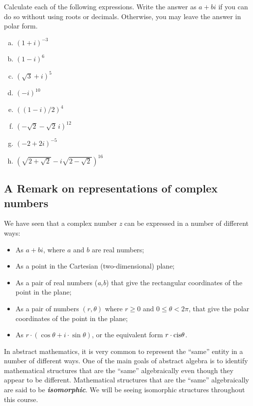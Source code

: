  

\begin{exercise}\label{exercise:complex:31}
Calculate each of the following expressions. Write the answer as $a + bi$ if you can do so without using roots or decimals. Otherwise, you may leave the answer in polar form.
\begin{multicols}{2}
\begin{enumerate}[(a)]
 
 \item
$(1+i)^{-3}$
 \item
$(1 - i)^{6}$
 \item
$(\sqrt{3}+i)^{5}$
 \item
$(-i)^{10}$
 \item
$((1-i)/2)^{4}$
 \item
$(-\sqrt{2} - \sqrt{2}\, i)^{12}$
 \item
$(-2+2i)^{-5}$
\item
$(\sqrt{2 + \sqrt{2}} - i\sqrt{2 - \sqrt{2}})^{16}$
\end{enumerate}
\end{multicols}
\end{exercise}


\subsection{A Remark on representations of complex numbers}

We have seen that a complex number \emph{z} can be expressed in a
number of different ways: 
\begin{itemize}
\item As $a+bi$, where $a$ and $b$ are real numbers; 
\item As a point in the Cartesian (two-dimensional) plane; 
\item As a pair of real numbers (\emph{a,b}) that give the rectangular coordinates
of the point in the plane; 
\item As a pair of numbers $(r,\theta)$ where $r\geq0$ and $0\le\theta<2\pi$,
that give the polar coordinates of the point in the plane; 
\item As $r\cdot(\cos\theta+i\cdot\sin\theta)$, or the equivalent form
$r\cdot\mbox{{cis}\ensuremath{\theta}}$.
\end{itemize}
In abstract mathematics, it is very common to represent the ``same''
entity in a number of different ways. One of the main goals of abstract
algebra is to identify mathematical structures that are the ``same''
algebraically even though they appear to be different. Mathematical
structures that are the ``same'' algebraically are said to be
\textbf{\emph{isomorphic}}. We will be seeing isomorphic structures
throughout this course.

